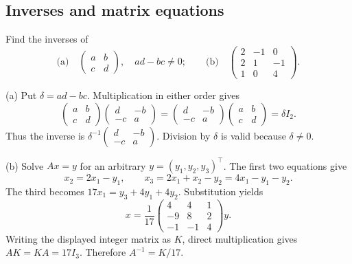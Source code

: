 \subsection*{Inverses and matrix equations}

\begin{problem}\label{ex:02:bapat-2-15}
Find the inverses of
\[
\text{(a)}\quad\begin{pmatrix}a&b\\c&d\end{pmatrix},\quad ad-bc\ne0;
\qquad
\text{(b)}\quad\begin{pmatrix}2&-1&0\\2&1&-1\\1&0&4\end{pmatrix}.
\]
\end{problem}
\begin{solution}
(a) Put $\delta=ad-bc$. Multiplication in either order gives
\[
\begin{pmatrix}a&b\\c&d\end{pmatrix}
\begin{pmatrix}d&-b\\-c&a\end{pmatrix}
=\begin{pmatrix}d&-b\\-c&a\end{pmatrix}
\begin{pmatrix}a&b\\c&d\end{pmatrix}
=\delta I_2.
\]
Thus the inverse is $\delta^{-1}\begin{pmatrix}d&-b\\-c&a\end{pmatrix}$.
Division by $\delta$ is valid because $\delta\ne0$.

(b) Solve $Ax=y$ for an arbitrary $y=(y_1,y_2,y_3)^\top$. The first two equations give
\[
x_2=2x_1-y_1,\qquad x_3=2x_1+x_2-y_2=4x_1-y_1-y_2.
\]
The third becomes $17x_1=y_3+4y_1+4y_2$. Substitution yields
\[
x=\frac1{17}
\begin{pmatrix}4&4&1\\-9&8&2\\-1&-1&4\end{pmatrix}y.
\]
Writing the displayed integer matrix as $K$, direct multiplication gives
$AK=KA=17I_3$. Therefore $A^{-1}=K/17$.
\end{solution}


